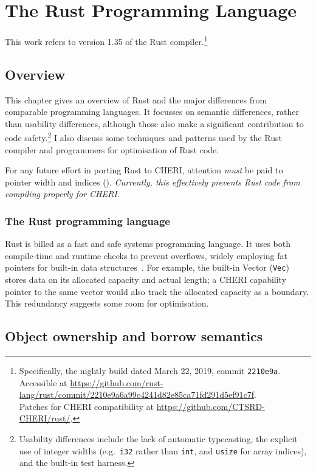 \documentclass[dissertation.tex]{subfiles}
\begin{document}
\chapter{The Rust Programming Language}
\label{ch:rust}

This work refers to version 1.35 of the Rust
compiler.\footnote{Specifically, the nightly build dated March 22, 2019,
commit \texttt{2210e9a}. \\ Accessible at
\url{https://github.com/rust-lang/rust/commit/2210e9a6a99c4241d82e85ca71fd291d5ef91c7f}.
\\ Patches for CHERI compatibility at \url{https://github.com/CTSRD-CHERI/rust/}.}


\section{Overview}
This chapter gives an overview of Rust and the major differences from
comparable programming languages.
It focusses on semantic differences, rather than usability differences,
although those also make a significant contribution to code
safety.\footnote{Usability differences include the lack of automatic
typecasting, the explicit use of integer widths (e.g.\ \texttt{i32}
rather than \texttt{int}, and \texttt{usize} for array indices), and the
built-in test harness.}
I also discuss some techniques and patterns used by the Rust compiler
and programmers for optimisation of Rust code.

For any future effort in porting Rust to CHERI, attention \emph{must} be
paid to pointer width and indices ().
\emph{Currently, this effectively prevents Rust code from compiling
properly for CHERI.}


\subsection{The Rust programming language}
Rust is billed as a fast and safe systems programming language.
It uses both compile-time and runtime checks to prevent overflows,
widely employing fat pointers for built-in data
structures~\cite{blandy-orendorff}.
For example, the built-in Vector (\texttt{Vec}) stores data on its
allocated capacity and actual length; a CHERI capability pointer to the
same vector would also track the allocated capacity as a boundary.
This redundancy suggests some room for optimisation.


\section{Object ownership and borrow semantics}
\label{sec:rust-borrow}
\end{document}
